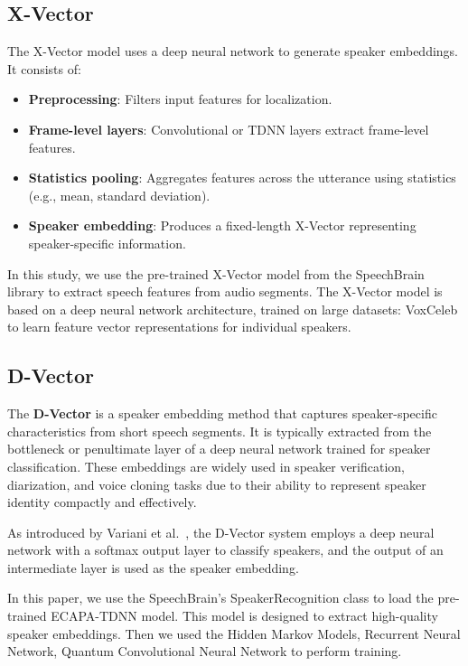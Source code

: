 \documentclass[conference]{IEEEtran}
\begin{document}
\subsection{X-Vector}

The X-Vector model uses a deep neural network to generate speaker embeddings. It consists of:

\begin{itemize} \item \textbf{Preprocessing}: Filters input features for localization.
    \item \textbf{Frame-level layers}: Convolutional or TDNN layers extract
          frame-level features. \item \textbf{Statistics pooling}: Aggregates
          features across the utterance using statistics (e.g., mean, standard deviation).
    \item \textbf{Speaker embedding}: Produces a fixed-length X-Vector
          representing speaker-specific information. \end{itemize}


In this study, we use the pre-trained X-Vector model from the SpeechBrain
library to extract speech features from audio segments. The X-Vector model
is based on a deep neural network architecture, trained on large
datasets: VoxCeleb to learn feature vector representations
for individual speakers.




\subsection{D-Vector}

The \textbf{D-Vector} is a speaker embedding method that captures speaker-specific
characteristics from short speech segments. It is typically extracted from the
bottleneck or penultimate layer of a deep neural network trained for speaker
classification. These embeddings are widely used in speaker verification,
diarization, and voice cloning tasks due to their ability to represent speaker
identity compactly and effectively.

As introduced by Variani et al.~\cite{variani2014deep}, the D-Vector system employs
a deep neural network with a softmax output layer to classify speakers, and the
output of an intermediate layer is used as the speaker embedding.


In this paper, we use the SpeechBrain's SpeakerRecognition class to load the pre-trained
ECAPA-TDNN model. This model is designed to extract high-quality speaker embeddings.
Then we used the Hidden Markov Models, Recurrent Neural Network,
Quantum Convolutional Neural Network to perform training.
\end{document}
